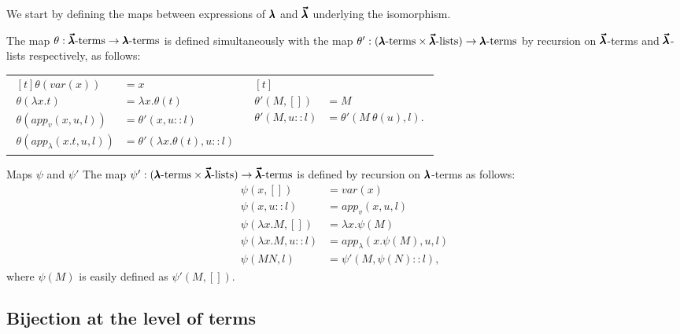 We start by defining the maps between expressions of $\pmb{\lambda}$ and $\pmb{\vec \lambda}$ underlying the isomorphism.

\begin{definition}
  The map $\theta : \pmb{\vec \lambda} \text{-terms} \to \pmb{\lambda} \text{-terms}$ is defined simultaneously with the map $\theta' : (\pmb{\lambda} \text{-terms} \times \pmb{\vec \lambda} \text{-lists}) \to \pmb{\lambda} \text{-terms}$ by recursion on $\pmb{\vec \lambda}$-terms and $\pmb{\vec \lambda}$-lists respectively, as follows:
  \begin{center}
  \begin{tabular}{cc}
    $ \begin{aligned}[t]
      \theta(var(x)) &= x \\
      \theta(\lambda x . t) &= \lambda x . \theta(t) \\
      \theta(app_v(x, u, l)) &= \theta'(x, u::l) \\
      \theta(app_\lambda (x.t, u, l)) &= \theta'(\lambda x . \theta(t), u::l)
    \end{aligned} $
    & \quad
    $ \begin{aligned}[t] \\
      \theta'(M, [])   &= M \\
      \theta'(M, u::l) &= \theta'(M \ \theta(u), l).
    \end{aligned} $
  \end{tabular}
  \end{center}
\end{definition}
  
\begin{definition}Maps $\psi$ and $\psi'$
  The map $\psi' : (\pmb{\lambda} \text{-terms} \times \pmb{\vec \lambda} \text{-lists}) \to \pmb{\vec \lambda} \text{-terms}$ is defined by recursion on $\pmb{\lambda}$-terms as follows:
  \begin{align*}
    \psi(x, []) &= var(x) \\
    \psi(x, u::l) &= app_v (x, u, l) \\
    \psi(\lambda x . M, []) &= \lambda x . \psi(M) \\
    \psi(\lambda x . M, u::l) &= app_\lambda (x . \psi(M), u, l) \\
    \psi(M N, l) &= \psi'(M, \psi(N)::l),              
  \end{align*}
  where $\psi(M)$ is easily defined as $\psi'(M, [])$.
\end{definition}

\subsection{Bijection at the level of terms}

